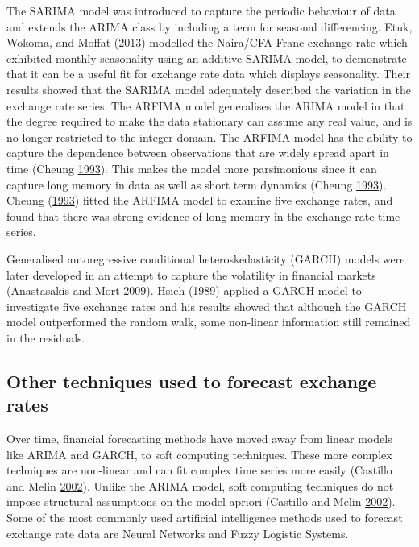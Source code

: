\documentclass[12pt,preprint, authoryear]{elsarticle}
\numberwithin{equation}{section}
\numberwithin{figure}{section}
\numberwithin{table}{section}
\begin{document}
The SARIMA model was introduced to capture the periodic behaviour of
data and extends the ARIMA class by including a term for seasonal
differencing. Etuk, Wokoma, and Moffat
(\protect\hyperlink{ref-etuk2013}{2013}) modelled the Naira/CFA Franc
exchange rate which exhibited monthly seasonality using an additive
SARIMA model, to demonstrate that it can be a useful fit for exchange
rate data which displays seasonality. Their results showed that the
SARIMA model adequately described the variation in the exchange rate
series. The ARFIMA model generalises the ARIMA model in that the degree
required to make the data stationary can assume any real value, and is
no longer restricted to the integer domain. The ARFIMA model has the
ability to capture the dependence between observations that are widely
spread apart in time (Cheung \protect\hyperlink{ref-cheung1993}{1993}).
This makes the model more parsimonious since it can capture long memory
in data as well as short term dynamics (Cheung
\protect\hyperlink{ref-cheung1993}{1993}). Cheung
(\protect\hyperlink{ref-cheung1993}{1993}) fitted the ARFIMA model to
examine five exchange rates, and found that there was strong evidence of
long memory in the exchange rate time series.

Generalised autoregressive conditional heteroskedasticity (GARCH) models
were later developed in an attempt to capture the volatility in
financial markets (Anastasakis and Mort
\protect\hyperlink{ref-anastasakis2009}{2009}). Hsieh (1989) applied a
GARCH model to investigate five exchange rates and his results showed
that although the GARCH model outperformed the random walk, some
non-linear information still remained in the residuals.

\subsection{Other techniques used to forecast exchange
rates}\label{other-techniques-used-to-forecast-exchange-rates}

Over time, financial forecasting methods have moved away from linear
models like ARIMA and GARCH, to soft computing techniques. These more
complex techniques are non-linear and can fit complex time series more
easily (Castillo and Melin \protect\hyperlink{ref-castillo2002}{2002}).
Unlike the ARIMA model, soft computing techniques do not impose
structural assumptions on the model apriori (Castillo and Melin
\protect\hyperlink{ref-castillo2002}{2002}). Some of the most commonly
used artificial intelligence methods used to forecast exchange rate data
are Neural Networks and Fuzzy Logistic Systems.
\end{document}
